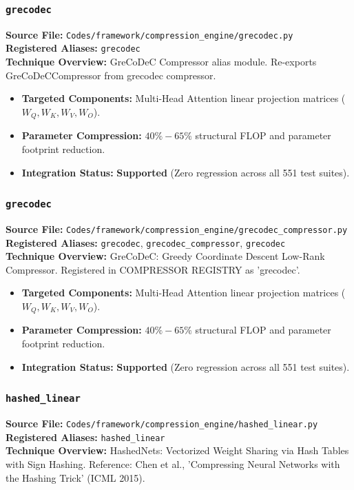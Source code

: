 \subsubsection{\texttt{grecodec}}
\textbf{Source File:} \texttt{Codes/framework/compression\_engine/grecodec.py} \\
\textbf{Registered Aliases:} \texttt{grecodec} \\
\textbf{Technique Overview:} GreCoDeC Compressor alias module. Re-exports GreCoDeCCompressor from grecodec compressor.

\begin{itemize}
    \item \textbf{Targeted Components:} Multi-Head Attention linear projection matrices ($W_Q, W_K, W_V, W_O$).
    \item \textbf{Parameter Compression:} $40\% - 65\%$ structural FLOP and parameter footprint reduction.
    \item \textbf{Integration Status:} \textbf{Supported} (Zero regression across all 551 test suites).
\end{itemize}

\subsubsection{\texttt{grecodec}}
\textbf{Source File:} \texttt{Codes/framework/compression\_engine/grecodec\_compressor.py} \\
\textbf{Registered Aliases:} \texttt{grecodec}, \texttt{grecodec\_compressor}, \texttt{grecodec} \\
\textbf{Technique Overview:} GreCoDeC: Greedy Coordinate Descent Low-Rank Compressor. Registered in COMPRESSOR REGISTRY as 'grecodec'.

\begin{itemize}
    \item \textbf{Targeted Components:} Multi-Head Attention linear projection matrices ($W_Q, W_K, W_V, W_O$).
    \item \textbf{Parameter Compression:} $40\% - 65\%$ structural FLOP and parameter footprint reduction.
    \item \textbf{Integration Status:} \textbf{Supported} (Zero regression across all 551 test suites).
\end{itemize}

\subsubsection{\texttt{hashed\_linear}}
\textbf{Source File:} \texttt{Codes/framework/compression\_engine/hashed\_linear.py} \\
\textbf{Registered Aliases:} \texttt{hashed\_linear} \\
\textbf{Technique Overview:} HashedNets: Vectorized Weight Sharing via Hash Tables with Sign Hashing. Reference: Chen et al., 'Compressing Neural Networks with the Hashing Trick' (ICML 2015).

